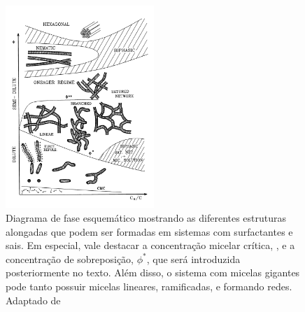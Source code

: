 		\begin{figure}[h]
			\centering
			\includegraphics[width=0.5\textwidth]{imagens/artigos/estruturas_regimes_concentracoes_cates_fielding}
			\caption{Diagrama de fase esquemático mostrando as diferentes estruturas alongadas que podem ser formadas em sistemas com surfactantes e sais. Em especial, vale destacar a concentração micelar crítica, \cmc, e a concentração de sobreposição, \(\phi^*\), que será introduzida posteriormente no texto. Além disso, o sistema com micelas gigantes pode tanto possuir micelas lineares, ramificadas, e formando redes. Adaptado de \citeauthor{Herb1994}}
			\label{fig:regimes_e_estruturas_lequeux}
		\end{figure}
		
